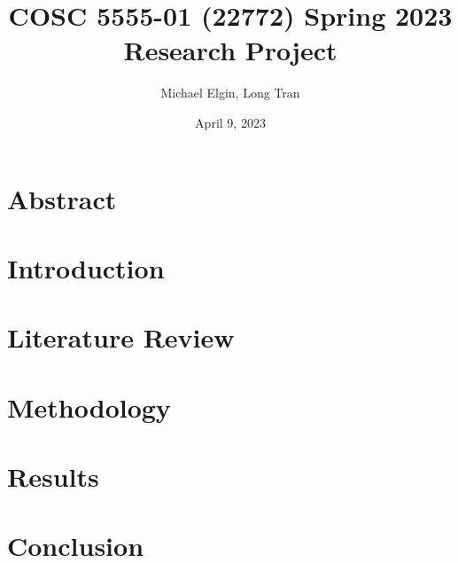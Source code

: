 \documentclass[12pt, a4paper]{article}
\title{COSC 5555-01 (22772) Spring 2023 Research Project}
\author{Michael Elgin, Long Tran}
\date{April 9, 2023}
\begin{document}
\maketitle

\section{Abstract}
\section{Introduction}
\section{Literature Review}
\section{Methodology}
\section{Results}
\section{Conclusion}

\end{document}
